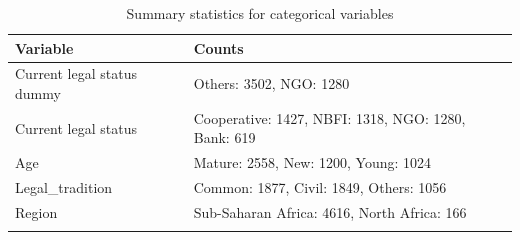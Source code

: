 \documentclass[a4paper,nobind]{templates/ociamthesis}
\begin{document}
\begin{table}

\caption{\label{tab:unnamed-chunk-32}Summary statistics for categorical variables}
\centering
\begin{tabu} to 
\toprule
Variable & Counts\\
\midrule
Current legal status dummy & Others: 3502, NGO: 1280\\
Current legal status & Cooperative: 1427, NBFI: 1318, NGO: 1280, Bank: 619\\
Age & Mature: 2558, New: 1200, Young: 1024\\
Legal\_tradition & Common: 1877, Civil: 1849, Others: 1056\\
Region & Sub-Saharan Africa: 4616, North Africa: 166\\
\bottomrule
{}\\
\end{tabu}
\end{table}
\end{document}
